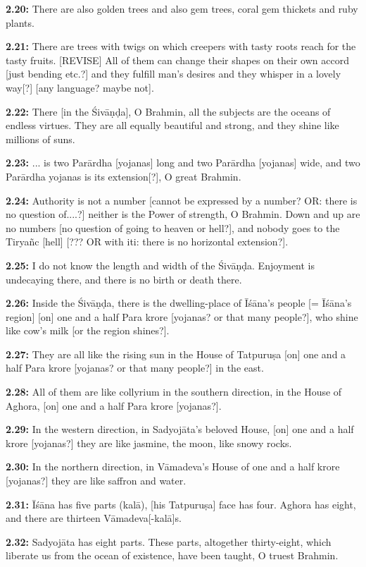 \documentclass{article}
\newcommand{\vsnum}[1]{\textbf{#1}}
\begin{document}
\vsnum{2.20: }There are also golden trees and also gem trees, coral gem thickets and ruby plants.

\vsnum{2.21: }There are trees with twigs on which creepers with tasty roots reach for the tasty fruits. [REVISE] All of them can change their shapes on their own accord [just bending etc.?] and they fulfill man's desires and they whisper in a lovely way[?] [any language? maybe not].

\vsnum{2.22: }There [in the Śivāṇḍa], O Brahmin, all the subjects are the oceans of endless virtues. They are all equally beautiful and strong, and they shine like millions of suns.

\vsnum{2.23: }... is two Parārdha [yojanas] long and two Parārdha [yojanas] wide, and two Parārdha yojanas is its extension[?], O great Brahmin.

\vsnum{2.24: }Authority is not a number [cannot be expressed by a number? OR: there is no question of....?] neither is the Power of strength, O Brahmin. Down and up are no numbers [no question of going to heaven or hell?], and nobody goes to the Tiryañc [hell] [??? OR with iti: there is no horizontal extension?].

\vsnum{2.25: }I do not know the length and width of the Śivāṇḍa. Enjoyment is undecaying there, and there is no birth or death there.

\vsnum{2.26: }Inside the Śivāṇḍa, there is the dwelling-place of Īśāna's people [= Īśāna's region] [on] one and a half Para krore [yojanas? or that many people?], who shine like cow's milk [or the region shines?].

\vsnum{2.27: }They are all like the rising sun in the House of Tatpuruṣa [on] one and a half Para krore [yojanas? or that many people?] in the east.

\vsnum{2.28: }All of them are like collyrium in the southern direction, in the House of Aghora, [on] one and a half Para krore [yojanas?].

\vsnum{2.29: }In the western direction, in Sadyojāta's beloved House, [on] one and a half krore [yojanas?] they are like jasmine, the moon, like snowy rocks.

\vsnum{2.30: }In the northern direction, in Vāmadeva's House of one and a half krore [yojanas?] they are like saffron and water.

\vsnum{2.31: }Īśāna has five parts (kalā), [his Tatpuruṣa] face has four. Aghora has eight, and there are thirteen Vāmadeva[-kalā]s.

\vsnum{2.32: }Sadyojāta has eight parts. These parts, altogether thirty-eight, which liberate us from the ocean of existence, have been taught, O truest Brahmin.
\end{document}
